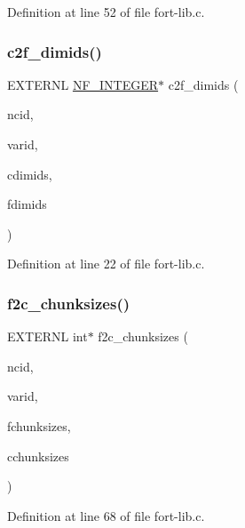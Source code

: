 Definition at line 52 of file fort-\/lib.\+c.

\mbox{\label{fort-lib_8c_a7ad9c588c0601d0aac54053a2dfc5fb1}} 
\subsubsection{\texorpdfstring{c2f\+\_\+dimids()}{c2f\_dimids()}}
{\footnotesize\ttfamily E\+X\+T\+E\+R\+NL \hyperlink{ncfortran_8h_a0fd3f9e9fc30661142a1fb549af678e7}{N\+F\+\_\+\+I\+N\+T\+E\+G\+ER}$\ast$ c2f\+\_\+dimids (\begin{DoxyParamCaption}\item[{int}]{ncid,  }\item[{int}]{varid,  }\item[{const int $\ast$}]{cdimids,  }\item[{\hyperlink{ncfortran_8h_a0fd3f9e9fc30661142a1fb549af678e7}{N\+F\+\_\+\+I\+N\+T\+E\+G\+ER} $\ast$}]{fdimids }\end{DoxyParamCaption})}



Definition at line 22 of file fort-\/lib.\+c.

\mbox{\label{fort-lib_8c_a2e587a74634daa53e8e5b12772243db8}} 
\subsubsection{\texorpdfstring{f2c\+\_\+chunksizes()}{f2c\_chunksizes()}}
{\footnotesize\ttfamily E\+X\+T\+E\+R\+NL int$\ast$ f2c\+\_\+chunksizes (\begin{DoxyParamCaption}\item[{int}]{ncid,  }\item[{int}]{varid,  }\item[{const \hyperlink{ncfortran_8h_a0fd3f9e9fc30661142a1fb549af678e7}{N\+F\+\_\+\+I\+N\+T\+E\+G\+ER} $\ast$}]{fchunksizes,  }\item[{int $\ast$}]{cchunksizes }\end{DoxyParamCaption})}



Definition at line 68 of file fort-\/lib.\+c.

